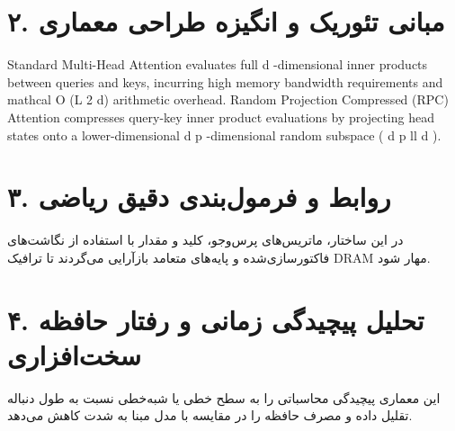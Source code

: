 \documentclass[12pt,a4paper]{article}
\begin{document}
\section*{۲. مبانی تئوریک و انگیزه طراحی معماری}
Standard Multi-Head Attention evaluates full d -dimensional inner products between queries and keys, incurring high memory bandwidth requirements and mathcal O (L 2 d) arithmetic overhead. Random Projection Compressed (RPC) Attention compresses query-key inner product evaluations by projecting head states onto a lower-dimensional d p -dimensional random subspace ( d p ll d ).

\section*{۳. روابط و فرمول‌بندی دقیق ریاضی}
در این ساختار، ماتریس‌های پرس‌وجو، کلید و مقدار با استفاده از نگاشت‌های فاکتورسازی‌شده و پایه‌های متعامد بازآرایی می‌گردند تا ترافیک DRAM مهار شود.

\section*{۴. تحلیل پیچیدگی زمانی و رفتار حافظه سخت‌افزاری}
این معماری پیچیدگی محاسباتی را به سطح خطی یا شبه‌خطی نسبت به طول دنباله تقلیل داده و مصرف حافظه را در مقایسه با مدل مبنا به شدت کاهش می‌دهد.
\end{document}
